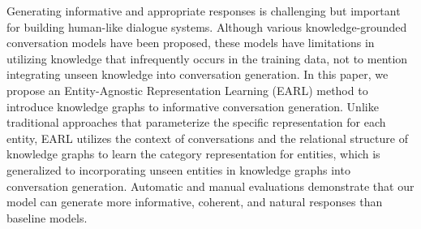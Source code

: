 Generating informative and appropriate responses is challenging but important for building human-like dialogue systems. Although various knowledge-grounded conversation models have been proposed, these models have limitations in utilizing knowledge that infrequently occurs in the training data, not to mention integrating unseen knowledge into conversation generation. In this paper, we propose an Entity-Agnostic Representation Learning (EARL) method to introduce knowledge graphs to informative conversation generation. Unlike traditional approaches that parameterize the specific representation for each entity, EARL utilizes the context of conversations and the relational structure of knowledge graphs to learn the category representation for entities, which is generalized to incorporating unseen entities in knowledge graphs into conversation generation. Automatic and manual evaluations demonstrate that our model can generate more informative, coherent, and natural responses than baseline models.
